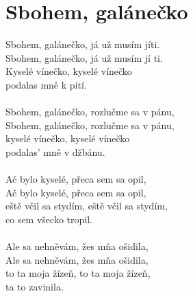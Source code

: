 \section{Sbohem, galánečko}
Sbohem, galánečko, já už musím jíti.\\
Sbohem, galánečko, já už musím jí ti.\\
Kyselé vínečko, kyselé vínečko\\
podalas mně k pití.\\
\\
Sbohem, galánečko, rozlučme sa v pánu,\\
Sbohem, galánečko, rozlučme sa v pánu,\\
kyselé vínečko, kyselé vínečko\\
podalas' mně v džbánu.\\
\\
Ač bylo kyselé, přeca sem sa opil,\\
Ač bylo kyselé, přeca sem sa opil,\\
eště včil sa stydím, eště včil sa stydím,\\
co sem všecko tropil.\\
\\
Ale sa nehněvám, žes mňa ošidila,\\
Ale sa nehněvám, žes mňa ošidila,\\
to ta moja žízeň, to ta moja žízeň,\\
ta to zavinila.\\